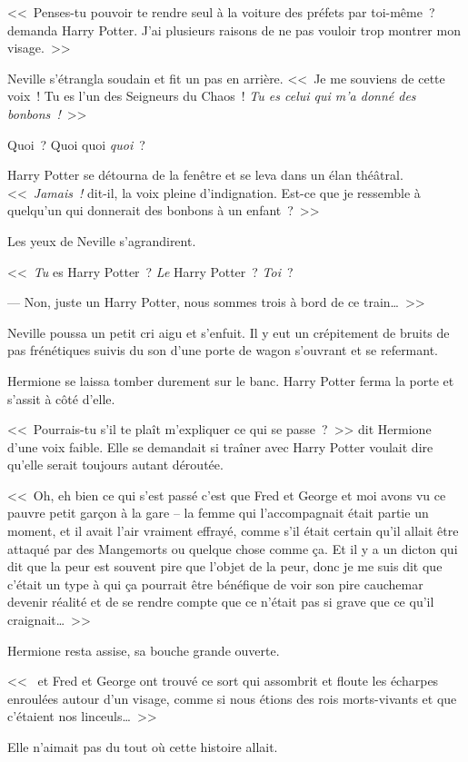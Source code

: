 <<~Penses-tu pouvoir te rendre seul à la voiture des préfets par toi-même~? demanda Harry Potter. J'ai plusieurs raisons de ne pas vouloir trop montrer mon visage.~>>

Neville s'étrangla soudain et fit un pas en arrière. <<~Je me souviens de cette voix~! Tu es l'un des Seigneurs du Chaos~! \emph{Tu es celui qui m'a donné des bonbons~!}~>>

Quoi~? Quoi quoi \emph{quoi}~?

Harry Potter se détourna de la fenêtre et se leva dans un élan théâtral. <<~\emph{Jamais~!} dit-il, la voix pleine d'indignation. Est-ce que je ressemble à quelqu'un qui donnerait des bonbons à un enfant~?~>>

Les yeux de Neville s'agrandirent.

<<~\emph{Tu} es Harry Potter~? \emph{Le} Harry Potter~? \emph{Toi}~?

--- Non, juste un Harry Potter, nous sommes trois à bord de ce train…~>>

Neville poussa un petit cri aigu et s'enfuit. Il y eut un crépitement de bruits de pas frénétiques suivis du son d'une porte de wagon s'ouvrant et se refermant.

Hermione se laissa tomber durement sur le banc. Harry Potter ferma la porte et s'assit à côté d'elle.

<<~Pourrais-tu s'il te plaît m'expliquer ce qui se passe~?~>> dit Hermione d'une voix faible. Elle se demandait si traîner avec Harry Potter voulait dire qu'elle serait toujours autant déroutée.

<<~Oh, eh bien ce qui s'est passé c'est que Fred et George et moi avons vu ce pauvre petit garçon à la gare -- la femme qui l'accompagnait était partie un moment, et il avait l'air vraiment effrayé, comme s'il était certain qu'il allait être attaqué par des Mangemorts ou quelque chose comme ça. Et il y a un dicton qui dit que la peur est souvent pire que l'objet de la peur, donc je me suis dit que c'était un type à qui ça pourrait être bénéfique de voir son pire cauchemar devenir réalité et de se rendre compte que ce n'était pas si grave que ce qu'il craignait…~>>

Hermione resta assise, sa bouche grande ouverte.

<<~ et Fred et George ont trouvé ce sort qui assombrit et floute les écharpes enroulées autour d'un visage, comme si nous étions des rois morts-vivants et que c'étaient nos linceuls…~>>

Elle n'aimait pas du tout où cette histoire allait.

